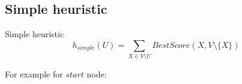 \subsection{Simple heuristic}

\begin{frame}
	\begin{block}{Simple heuristic}
		\[ h_{simple}( U ) = \sum_{X \in V \setminus U} BestScore( X , V \setminus \{ X \} ) \]
	\end{block}
	\pause
	For example for \alert{$start$} node:
	\begin{figure}
		\centering
		
	\end{figure}
\end{frame}